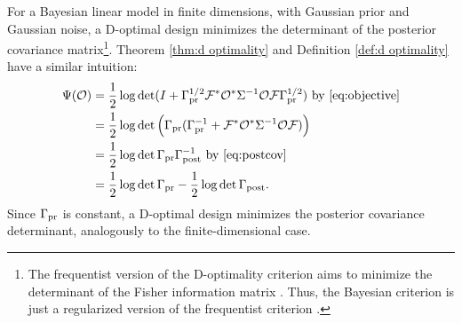 For a Bayesian linear model in finite dimensions, with Gaussian prior
and Gaussian noise, a D-optimal design minimizes the determinant of
the posterior covariance matrix\footnote{The frequentist version of
the D-optimality criterion aims to minimize the determinant of the
Fisher information matrix \cite[page 16]{Ucinski05}. Thus, the
Bayesian criterion is just a regularized version of the frequentist
criterion \cite{Chaloner1995}.}. Theorem \ref{thm:d optimality} and
Definition \ref{def:d optimality} have a similar intuition:
\begin{align*}
  \begin{split}
    \tar(\obs) &= \frac12 \log \det ( I + \prcov^{1/2}  \fwd ^* \obs^* \Sigma^{-1} \obs \fwd \prcov^{1/2}) \text{ by \eqref{eq:objective}}\\
    &= \frac12 \log \det \Big( \prcov ( \prcov^{-1} + \fwd ^* \obs^* \Sigma^{-1} \obs \fwd) \Big )\\
    &= \frac12 \log \det \prcov \postcov^{-1} \text{ by \eqref{eq:postcov}} \\
    &= \frac12 \log \det \prcov -\frac12 \log \det \postcov.
  \end{split}
\end{align*}
Since $\Gamma_{\textup{pr}}$ is constant, a D-optimal design minimizes the posterior
covariance determinant, analogously to the finite-dimensional case.


